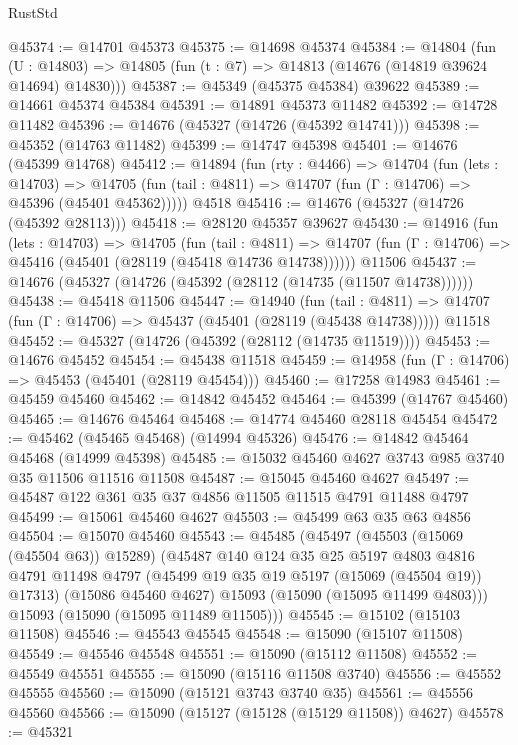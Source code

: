 \begin{lexlean}{RustStd}
\begin{coremodule}
@45374 := @14701 @45373
@45375 := @14698 @45374
@45384 := @14804
    (fun (U : @14803) => @14805 (fun (t : @7) => @14813 (@14676 (@14819 @39624 @14694) @14830)))
@45387 := @45349 (@45375 @45384) @39622
@45389 := @14661 @45374 @45384
@45391 := @14891 @45373 @11482
@45392 := @14728 @11482
@45396 := @14676 (@45327 (@14726 (@45392 @14741)))
@45398 := @45352 (@14763 @11482)
@45399 := @14747 @45398
@45401 := @14676 (@45399 @14768)
@45412 := @14894
    (fun (rty : @4466) =>
    @14704
      (fun (lets : @14703) =>
      @14705 (fun (tail : @4811) => @14707 (fun (Γ : @14706) => @45396 (@45401 @45362)))))
    @4518
@45416 := @14676 (@45327 (@14726 (@45392 @28113)))
@45418 := @28120 @45357 @39627
@45430 := @14916
    (fun (lets : @14703) =>
    @14705
      (fun (tail : @4811) =>
      @14707 (fun (Γ : @14706) => @45416 (@45401 (@28119 (@45418 @14736 @14738))))))
    @11506
@45437 := @14676 (@45327 (@14726 (@45392 (@28112 (@14735 (@11507 @14738))))))
@45438 := @45418 @11506
@45447 := @14940
    (fun (tail : @4811) => @14707 (fun (Γ : @14706) => @45437 (@45401 (@28119 (@45438 @14738)))))
    @11518
@45452 := @45327 (@14726 (@45392 (@28112 (@14735 @11519))))
@45453 := @14676 @45452
@45454 := @45438 @11518
@45459 := @14958 (fun (Γ : @14706) => @45453 (@45401 (@28119 @45454)))
@45460 := @17258 @14983
@45461 := @45459 @45460
@45462 := @14842 @45452
@45464 := @45399 (@14767 @45460)
@45465 := @14676 @45464
@45468 := @14774 @45460 @28118 @45454
@45472 := @45462 (@45465 @45468) (@14994 @45326)
@45476 := @14842 @45464 @45468 (@14999 @45398)
@45485 := @15032 @45460 @4627 @3743 @985 @3740 @35 @11506 @11516 @11508
@45487 := @15045 @45460 @4627
@45497 := @45487 @122 @361 @35 @37 @4856 @11505 @11515 @4791 @11488 @4797
@45499 := @15061 @45460 @4627
@45503 := @45499 @63 @35 @63 @4856
@45504 := @15070 @45460
@45543 := @45485
    (@45497
      (@45503 (@15069 (@45504 @63)) @15289)
      (@45487
        @140
        @124
        @35
        @25
        @5197
        @4803
        @4816
        @4791
        @11498
        @4797
        (@45499 @19 @35 @19 @5197 (@15069 (@45504 @19)) @17313)
        (@15086 @45460 @4627)
        @15093
        (@15090 (@15095 @11499 @4803)))
      @15093
      (@15090 (@15095 @11489 @11505)))
@45545 := @15102 (@15103 @11508)
@45546 := @45543 @45545
@45548 := @15090 (@15107 @11508)
@45549 := @45546 @45548
@45551 := @15090 (@15112 @11508)
@45552 := @45549 @45551
@45555 := @15090 (@15116 @11508 @3740)
@45556 := @45552 @45555
@45560 := @15090 (@15121 @3743 @3740 @35)
@45561 := @45556 @45560
@45566 := @15090 (@15127 (@15128 (@15129 @11508)) @4627)
@45578 := @45321

\end{coremodule}
\end{lexlean}
